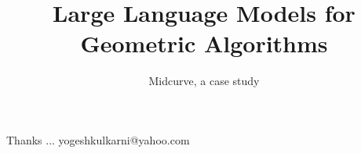 \documentclass[xcolor=dvipsnames,compress,t,pdf,9pt]{beamer}
\title[\insertframenumber /\inserttotalframenumber]{Large Language Models for Geometric Algorithms}
\subtitle[]{Midcurve, a case study}
\begin{document}
	\begin{frame}
	\titlepage
%
	\end{frame}
	
%	
	
	
	\begin{frame}[c]{}
	Thanks ...
	\vspace{5mm}
	yogeshkulkarni@yahoo.com
	\end{frame}
\end{document}
